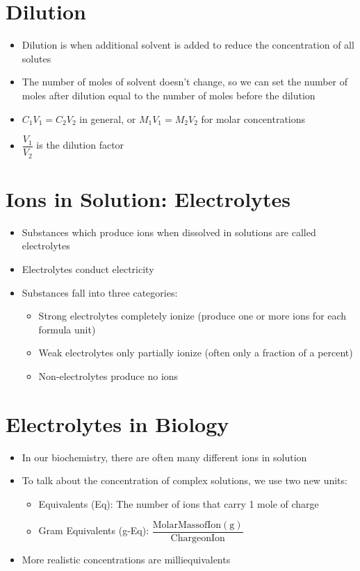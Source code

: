 \documentclass[12pt, openany, letterpaper]{memoir}
\begin{document}
\section{Dilution}
\begin{itemize}
	\item Dilution is when additional solvent is added to reduce the concentration of all solutes
	\item The number of moles of solvent doesn't change, so we can set the number of moles after dilution equal to the number of moles before the dilution
	\item $C_1V_1=C_2V_2$ in general, or $M_1V_1=M_2V_2$ for molar concentrations
	\item $\dfrac{V_1}{V_2}$ is the dilution factor
\end{itemize}
\section{Ions in Solution: Electrolytes}
\begin{itemize}
	\item Substances which produce ions when dissolved in solutions are called electrolytes
	\item Electrolytes conduct electricity
	\item Substances fall into three categories:
	      \begin{itemize}
		      \item Strong electrolytes completely ionize (produce one or more ions for each formula unit)
		      \item Weak electrolytes only partially ionize (often only a fraction of a percent)
		      \item Non-electrolytes produce no ions
	      \end{itemize}
\end{itemize}
\section{Electrolytes in Biology}
\begin{itemize}
	\item In our biochemistry, there are often many different ions in solution
	\item To talk about the concentration of complex solutions, we use two new units:
	      \begin{itemize}
		      \item Equivalents (Eq): The number of ions that carry 1 mole of charge
		      \item Gram Equivalents (g-Eq): $\dfrac{\mathrm{Molar Mass of Ion (g)}}{\mathrm{Charge on Ion}}$
	      \end{itemize}
	\item More realistic concentrations are milliequivalents
\end{itemize}
\end{document}
